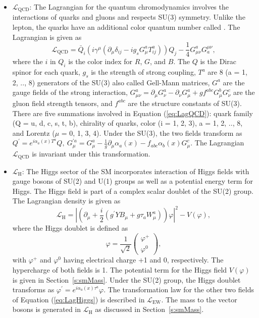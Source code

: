 \begin{itemize} [leftmargin=*]
\item \textbf{$\mathcal{L}_\text{QCD}$}: The Lagrangian for the quantum
chromodynamics involves the interactions of quarks and gluons and 
respects SU(3) symmetry. Unlike the lepton, the quarks have an additional 
color quantum number called . The Lagrangian is given as
\begin{equation}
\mathcal{L}_\text{QCD} = \bar Q_{i} \left( i\gamma^\mu(
\partial_\mu\delta_{ij} - i g_s G_\mu^a T^a_{ij})\right) Q_j
- \frac{1}{4} G^a_{\mu\nu} G^{\mu\nu}_a,
\label{eq:LagQCD}
\end{equation}
where the $i$ in $Q_i$ is the color index for $R$, $G$, and $B$. The $Q$ is
the Dirac spinor for each quark, $g_s$ is the strength
of strong coupling, $T^a$ are 8 (a = 1, 2, .., 8) generators of the SU(3)
also called Gell-Mann matrices, $G^a$ are the gauge fields of the strong 
interaction, $G_{\mu\nu}^a = \partial_\mu G_\nu^a - \partial_\nu G_\mu^a + g 
f^{abc}G_\mu^bG_\nu^c$ are the gluon field strength tensors, and $f^{abc}$ 
are the structure constants of SU(3). There are five summations involved
in Equation (\ref{eq:LagQCD}): quark family (Q = u, d, c, s, t, b), 
chirality of quarks, color (i = 1, 2, 3), a = 1, 2, .., 8, and
Lorentz ($\mu$ = 0, 1, 3, 4). Under the SU(3), the two fields transform as 
$Q^\prime = e^{i\alpha_a(x)T^a }Q, ~G_\mu^{\prime a} = G_\mu^a - 
\frac{1}{g}\partial_\mu\alpha_a(x) - f_{abc}\alpha_b(x) G^c_\mu$. The 
Lagrangian $\mathcal{L}_\text{QCD}$ is invariant under this transformation.

\item \textbf{$\mathcal{L}_\text{H}$}: The Higgs sector of the SM incorporates
				interaction of Higgs fields with gauge bosons of SU(2) and U(1) groups
				as well as a potential energy term for Higgs. The Higgs field is part 
				of a complex scalar doublet of the SU(2) group. The Lagrangian density is 
				given as
				\begin{equation}
				\mathcal{L}_\text{H} = \left|\left(\partial_\mu + \frac{i}{2} \left( 
								g^\prime Y B_\mu + g \tau_a W_\mu^a \right)\right)\varphi
								\right|^2 - V(\varphi), 
				\label{eq:LagHiggs}
				\end{equation}
				where the Higgs doublet is defined as
				\begin{equation}
				\varphi = \frac{1}{\sqrt 2} \left(\begin{array}{c}\varphi^+ \\ 
				\varphi^0\end{array}\right),
				\end{equation}
				with $\varphi^+$ and $\varphi^0$ having electrical charge +1 and 0, 
respectively. 
				The hypercharge of both fields is 1. The potential term for the Higgs 
				field $V(\varphi)$ is given in Section~\ref{s:smMass}. Under the SU(2)
				group, the Higgs doublet transforms as $\varphi^\prime = e^{i\alpha_a(x)
				\tau^a}\varphi$. The transformation law for the other two fields of 
				Equation (\ref{eq:LagHiggs}) is described in $\mathcal{L}_\text{EW}$. 
				The mass to the vector bosons is generated in $\mathcal{L}_\text{H}$ as
				discussed in Section~\ref{s:smMass}.


\end{itemize}
